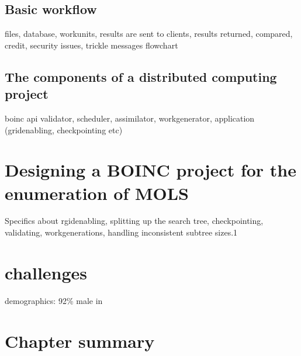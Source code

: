 \subsection{Basic workflow}

files, database, workunits, results are sent to clients, results returned, compared, credit,  security issues, trickle messages
flowchart
\subsection{The components of a distributed computing project}
boinc api
validator, scheduler, assimilator, workgenerator, application (gridenabling, checkpointing etc)

\section{Designing a BOINC project for the enumeration of MOLS}

Specifics about rgidenabling, splitting up the search tree,  checkpointing, validating, workgenerations, handling inconsistent subtree sizes.1


\section{challenges}
demographics: 92\% male in \cite{anderson:pc}



\section{Chapter summary}